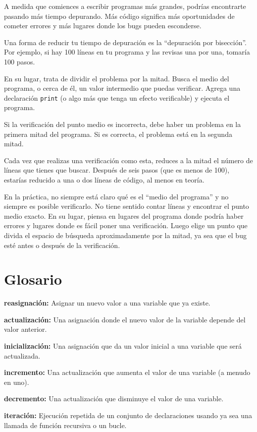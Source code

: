 A medida que comiences a escribir programas más grandes, podrías encontrarte pasando más tiempo depurando. Más código significa más oportunidades de cometer errores y más lugares donde los bugs pueden esconderse.

Una forma de reducir tu tiempo de depuración es la ``depuración por bisección''. Por ejemplo, si hay 100 líneas en tu programa y las revisas una por una, tomaría 100 pasos.

En su lugar, trata de dividir el problema por la mitad. Busca el medio del programa, o cerca de él, un valor intermedio que puedas verificar. Agrega una declaración \texttt{print} (o algo más que tenga un efecto verificable) y ejecuta el programa.

Si la verificación del punto medio es incorrecta, debe haber un problema en la primera mitad del programa. Si es correcta, el problema está en la segunda mitad.

Cada vez que realizas una verificación como esta, reduces a la mitad el número de líneas que tienes que buscar. Después de seis pasos (que es menos de 100), estarías reducido a una o dos líneas de código, al menos en teoría.

En la práctica, no siempre está claro qué es el ``medio del programa'' y no siempre es posible verificarlo. No tiene sentido contar líneas y encontrar el punto medio exacto. En su lugar, piensa en lugares del programa donde podría haber errores y lugares donde es fácil poner una verificación. Luego elige un punto que divida el espacio de búsqueda aproximadamente por la mitad, ya sea que el bug esté antes o después de la verificación.

\section{Glosario}

\textbf{reasignación:} Asignar un nuevo valor a una variable que ya existe.

\textbf{actualización:} Una asignación donde el nuevo valor de la variable depende del valor anterior.

\textbf{inicialización:} Una asignación que da un valor inicial a una variable que será actualizada.

\textbf{incremento:} Una actualización que aumenta el valor de una variable (a menudo en uno).

\textbf{decremento:} Una actualización que disminuye el valor de una variable.

\textbf{iteración:} Ejecución repetida de un conjunto de declaraciones usando ya sea una llamada de función recursiva o un bucle.

